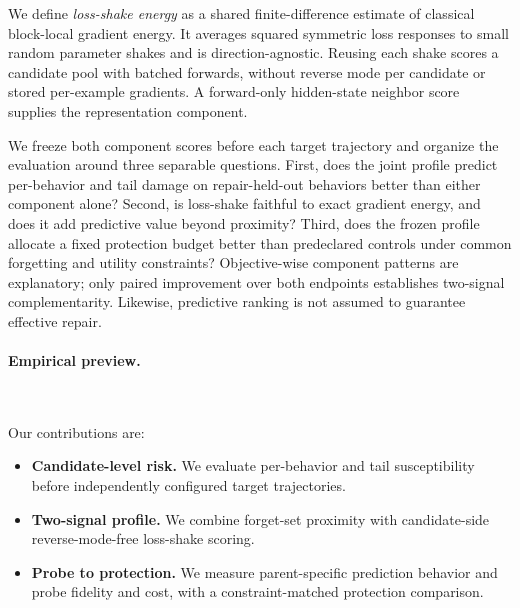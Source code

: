 We define \emph{loss-shake energy} as a shared finite-difference estimate of
classical block-local gradient energy. It averages squared symmetric loss
responses to small random parameter shakes and is direction-agnostic. Reusing
each shake scores a candidate pool with batched forwards, without reverse mode
per candidate or stored per-example gradients. A forward-only hidden-state
neighbor score supplies the representation component.

We freeze both component scores before each target trajectory and organize
the evaluation around three separable questions. First, does the joint
profile predict per-behavior and tail damage on repair-held-out behaviors
better than either component alone? Second, is loss-shake faithful to exact gradient
energy, and does it add predictive value beyond proximity? Third, does the
frozen profile allocate a fixed protection budget better than predeclared
controls under common forgetting and utility constraints? Objective-wise component patterns
are explanatory; only paired improvement over both endpoints establishes
two-signal complementarity. Likewise, predictive ranking is not assumed to
guarantee effective repair.

\paragraph{Empirical preview.}
{\setlength{\emergencystretch}{3em}
\TailHeadline\ \PredictionHeadline\ \FidelityHeadline\
\ProtectionHeadline\ \TransferHeadline\par}

Our contributions are:
\begin{itemize}
    \item \textbf{Candidate-level risk.} We evaluate
    per-behavior and tail susceptibility before independently configured
    target trajectories.
    \item \textbf{Two-signal profile.} We combine
    forget-set proximity with candidate-side reverse-mode-free loss-shake
    scoring.
    \item \textbf{Probe to protection.} We measure
    parent-specific prediction behavior and probe fidelity and cost,
    with a constraint-matched protection comparison.
\end{itemize}
